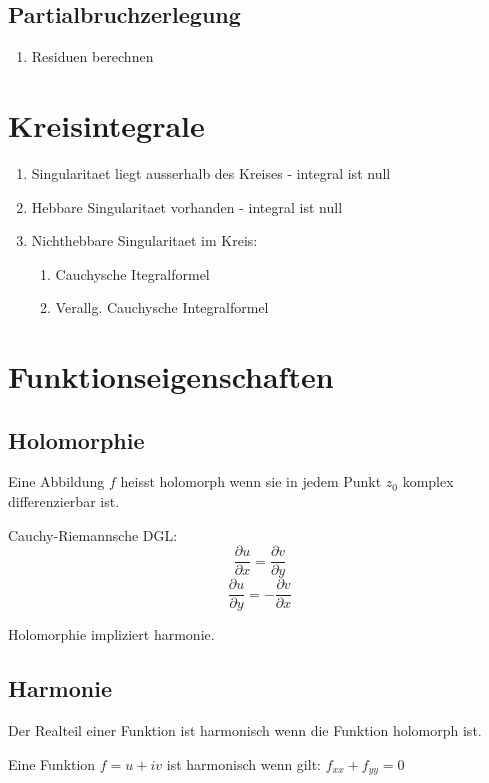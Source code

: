 \documentclass[10pt,a4paper]{article}
\begin{document}
\subsection{Partialbruchzerlegung}
\begin{enumerate}
\item Residuen berechnen
\end{enumerate}

\section{Kreisintegrale}
\begin{enumerate}
 \item Singularitaet liegt ausserhalb des Kreises - integral ist null
 \item Hebbare Singularitaet vorhanden - integral ist null
 \item Nichthebbare Singularitaet im Kreis:
 \begin{enumerate}
  \item Cauchysche Itegralformel
  \item Verallg. Cauchysche Integralformel
 \end{enumerate}
\end{enumerate}

\section{Funktionseigenschaften}
\subsection{Holomorphie}
Eine Abbildung $f$ heisst holomorph wenn sie in jedem Punkt $z_0$ komplex differenzierbar ist.

Cauchy-Riemannsche DGL:
\[
\frac{\partial u}{\partial x} = \frac{\partial v}{\partial y}
\]\[
\frac{\partial u}{\partial y} = - \frac{\partial v}{\partial x}
\]

Holomorphie impliziert harmonie.

\subsection{Harmonie}
Der Realteil einer Funktion ist harmonisch wenn die Funktion holomorph ist.

Eine Funktion $f=u + iv$ ist harmonisch wenn gilt: $f_{xx} + f_{yy} = 0$
\end{document}
